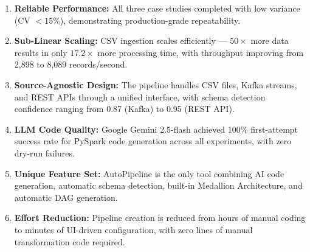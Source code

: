 \documentclass[12pt, a4paper]{article}
\begin{document}
\begin{enumerate}[label=\textbf{\arabic*.}]
    \item \textbf{Reliable Performance:} All three case studies completed with low variance (CV $< 15\%$), demonstrating production-grade repeatability.

    \item \textbf{Sub-Linear Scaling:} CSV ingestion scales efficiently --- $50\times$ more data results in only $17.2\times$ more processing time, with throughput improving from 2,898 to 8,089 records/second.

    \item \textbf{Source-Agnostic Design:} The pipeline handles CSV files, Kafka streams, and REST APIs through a unified interface, with schema detection confidence ranging from 0.87 (Kafka) to 0.95 (REST API).

    \item \textbf{LLM Code Quality:} Google Gemini 2.5-flash achieved 100\% first-attempt success rate for PySpark code generation across all experiments, with zero dry-run failures.

    \item \textbf{Unique Feature Set:} AutoPipeline is the only tool combining AI code generation, automatic schema detection, built-in Medallion Architecture, and automatic DAG generation.

    \item \textbf{Effort Reduction:} Pipeline creation is reduced from hours of manual coding to minutes of UI-driven configuration, with zero lines of manual transformation code required.
\end{enumerate}
\end{document}
